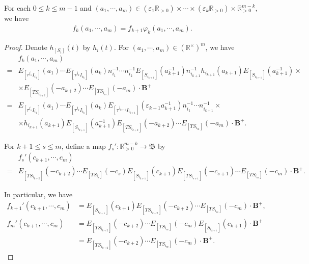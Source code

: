 \documentclass[10pt,a4paper]{amsart}
\def\leq{\leqslant}  \def\geq{\geqslant}
\begin{document}
\begin{proposition}\label{fk}
   For each $0\leq k\leq m-1$ and $(a_1,\cdots,a_m)\in (\varepsilon_1\mathbb{R}_{>0})\times \cdots \times (\varepsilon_k\mathbb{R}_{>0})\times \mathbb{R}_{>0}^{m-k}$, we have 
    \begin{align*}
        f_k(a_1,\cdots,a_m)=f_{k+1}\varphi_k(a_1,\cdots,a_m).
    \end{align*}
\end{proposition}

\begin{proof}
    Denote $h_{[S_i]}(t)$ by $h_i(t)$.
For $(a_1,\cdots,a_m)\in (\mathbb{R}^{\times})^m$, we have 
\begin{align*}
    &f_k(a_1,\cdots,a_m)\\
    =&E_{[\tau^{j_1}I_{i_1}]}(a_1) \cdots E_{[\tau^{j_k}I_{i_k}]}(a_k) n_{i_1}^{-1}\cdots n_{i_k}^{-1} E_{[S_{i_{k+1}}]}(a_{k+1}^{-1}) n_{i_{k+1}}^{-1} h_{i_{k+1}}(a_{k+1}) E_{[S_{i_{k+1}}]}(a_{k+1}^{-1})\times \\
    & \times  E_{[TS_{i_{k+2}}]}(-a_{k+2}) \cdots E_{[TS_{i_m}]}(-a_m) \cdot \mathbf{B}^+\\
    =&E_{[\tau^{j_1}I_{i_1}]}(a_1) \cdots E_{[\tau^{j_k}I_{i_k}]}(a_k) E_{[\tau^{j_{k+1}}I_{i_{k+1}}]}(\varepsilon_{k+1}a_{k+1}^{-1}) n_{i_1}^{-1}\cdots n_{i_{k+1}}^{-1}\times \\ 
    & \times h_{i_{k+1}}(a_{k+1}) E_{[S_{i_{k+1}}]}(a_{k+1}^{-1}) E_{[TS_{i_{k+2}}]}(-a_{k+2}) \cdots E_{[TS_{i_m}]}(-a_m) \cdot \mathbf{B}^+.
\end{align*}

    For $k+1\leq s \leq m$, define a map $f_s':\mathbb{R}_{>0}^{m-k}\rightarrow \mathfrak{B}$ by 
    \begin{align*}
        &f_s'(c_{k+1},\cdots,c_m)\\
        =&E_{[TS_{i_{k+2}}]}(-c_{k+2})\cdots E_{[TS_{i_{s}}]}(-c_s) E_{[S_{i_{k+1}}]}(c_{k+1}) E_{[TS_{i_{s+1}}]}(-c_{s+1})\cdots E_{[TS_{i_m}]}(-c_m)\cdot \mathbf{B}^+.
    \end{align*}

    In particular, we have 
    \begin{align*}
        f_{k+1}'(c_{k+1},\cdots,c_m)&=E_{[S_{i_{k+1}}]}(c_{k+1}) E_{[TS_{i_{k+2}}]}(-c_{k+2})\cdots E_{[TS_{i_{m}}]}(-c_m)\cdot \mathbf{B}^+,\\
        f_m'(c_{k+1},\cdots,c_m)&=E_{[TS_{i_{k+2}}]}(-c_{k+2})\cdots E_{[TS_{i_{m}}]}(-c_m)E_{[S_{i_{k+1}}]}(c_{k+1}) \cdot \mathbf{B}^+\\
        &= E_{[TS_{i_{k+2}}]}(-c_{k+2})\cdots E_{[TS_{i_{m}}]}(-c_m) \cdot \mathbf{B}^+.
    \end{align*}


\end{proof}
\end{document}
